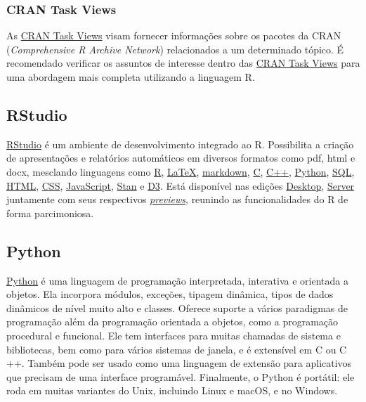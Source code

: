 \documentclass[
]{book}
\theoremstyle{definition}
\theoremstyle{definition}
\theoremstyle{definition}
\theoremstyle{remark}
\begin{document}
\hypertarget{cran-task-views}{%
\subsubsection*{CRAN Task Views}\label{cran-task-views}}

As \href{https://cran.r-project.org/web/views/}{CRAN Task Views} visam fornecer informações sobre os pacotes da CRAN (\emph{Comprehensive R Archive Network}) relacionados a um determinado tópico. É recomendado verificar os assuntos de interesse dentro das \href{https://cran.r-project.org/web/views/}{CRAN Task Views} para uma abordagem mais completa utilizando a linguagem R.

\hypertarget{rstudio}{%
\subsection{RStudio}\label{rstudio}}

\href{https://www.rstudio.com/}{RStudio} é um ambiente de desenvolvimento integrado ao R. Possibilita a criação de apresentações e relatórios automáticos em diversos formatos como pdf, html e docx, mesclando linguagens como \href{https://www.r-project.org/}{R}, \href{https://www.latex-project.org/}{LaTeX}, \href{https://www.markdownguide.org/}{markdown}, \href{http://www.open-std.org/jtc1/sc22/wg14/www/docs/n1256.pdf}{C}, \href{http://www.cplusplus.com/}{C++}, \href{https://www.python.org/}{Python}, \href{https://www.mysql.com/}{SQL}, \href{https://html.spec.whatwg.org/}{HTML}, \href{https://www.w3.org/standards/webdesign/htmlcss}{CSS}, \href{https://www.ecma-international.org/ecma-262/11.0/}{JavaScript}, \href{https://mc-stan.org/}{Stan} e \href{https://d3js.org/}{D3}. Está disponível nas edições \href{https://www.rstudio.com/products/rstudio-desktop/}{Desktop}, \href{https://www.rstudio.com/products/rstudio/download-server/}{Server} juntamente com seus respectivos \href{https://www.rstudio.com/products/rstudio/download/preview/}{\emph{previews}}, reunindo as funcionalidades do R de forma parcimoniosa.

\hypertarget{python}{%
\subsection{Python}\label{python}}

\href{https://www.python.org/}{Python} é uma linguagem de programação interpretada, interativa e orientada a objetos. Ela incorpora módulos, exceções, tipagem dinâmica, tipos de dados dinâmicos de nível muito alto e classes. Oferece suporte a vários paradigmas de programação além da programação orientada a objetos, como a programação procedural e funcional. Ele tem interfaces para muitas chamadas de sistema e bibliotecas, bem como para vários sistemas de janela, e é extensível em C ou C ++. Também pode ser usado como uma linguagem de extensão para aplicativos que precisam de uma interface programável. Finalmente, o Python é portátil: ele roda em muitas variantes do Unix, incluindo Linux e macOS, e no Windows.
\end{document}
